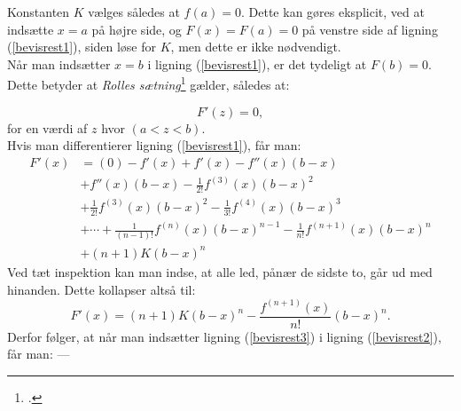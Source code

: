 \documentclass[12pt, a4paper]{article}
\begin{document}
\begin{refsection}
\begin{savenotes}
\noindent%
\begin{minipage}{0.6\textwidth}
Konstanten $K$ vælges således at $f(a)=0$. Dette kan gøres eksplicit, ved at indsætte $x=a$ på højre side, og $F(x)=F(a)=0$ på venstre side af ligning (\ref{bevisrest1}), siden løse for $K$, men dette er ikke nødvendigt.\\
Når man indsætter $x=b$ i ligning (\ref{bevisrest1}), er det tydeligt at  $F(b)=0$.\\
Dette betyder at \textit{Rolles sætning}\footcite[s. 210]{calculuswithanalyticgeometry} gælder, således at:
\end{minipage}
\begin{minipage}{0.4\textwidth}
\begin{center}
\end{center}
\end{minipage}
\end{savenotes}



\begin{equation}\label{bevisrest2}
    F'(z)=0,
\end{equation}
for en værdi af $z$ hvor $(a<z<b)$.\\
Hvis man differentierer ligning (\ref{bevisrest1}), får man:
\begin{equation*}
    \begin{aligned}
        F'(x) &=(0) -f'(x)+f'(x)-f''(x)(b-x)\\
              &+f''(x)(b-x)-\frac{1}{2!}f^{(3)}(x)(b-x)^2\\
              &+\frac{1}{2!}f^{(3)}(x)(b-x)^2-\frac{1}{3!}f^{(4)}(x)(b-x)^3\\
              &+\cdots + \frac{1}{(n-1)!}f^{(n)}(x)(b-x)^{n-1}-\frac{1}{n!}f^{(n+1)}(x)(b-x)^n\\
              &+(n+1)K(b-x)^n
    \end{aligned}
\end{equation*}
Ved tæt inspektion kan man indse, at alle led, pånær de sidste to, går ud med hinanden. Dette kollapser altså til:
\begin{equation}\label{bevisrest3}
    F'(x)=(n+1)K(b-x)^n-\frac{f^{(n+1)}(x)}{n!}(b-x)^n.
\end{equation}
Derfor følger, at når man indsætter ligning (\ref{bevisrest3}) i ligning (\ref{bevisrest2}), får man:
---

\end{refsection}
\end{document}
